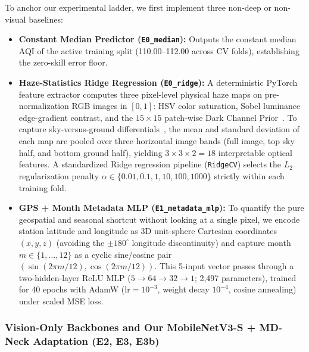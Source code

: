 \documentclass[conference]{IEEEtran}
\begin{document}
To anchor our experimental ladder, we first implement three non-deep or
non-visual baselines:
\begin{itemize}
  \item \textbf{Constant Median Predictor (\texttt{E0\_median}):} Outputs the
        constant median AQI of the active training split (110.00--112.00 across
        CV folds), establishing the zero-skill error floor.
  \item \textbf{Haze-Statistics Ridge Regression (\texttt{E0\_ridge}):} A
        deterministic PyTorch feature extractor computes three pixel-level
        physical haze maps on pre-normalization RGB images in $[0, 1]$: HSV
        color saturation, Sobel luminance edge-gradient contrast, and the
        $15 \times 15$ patch-wise Dark Channel
        Prior~\cite{marzaguiReviewImageQuality2024,
        wangPrototypeFeatureRepresentationGuided2026}. To capture
        sky-versus-ground differentials~\cite{chakrabortyCanImageTell2024,
        vahdatpourForecastingVisualizingAir2025}, the mean and standard
        deviation of each map are pooled over three horizontal image bands (full
        image, top sky half, and bottom ground half), yielding
        $3 \times 3 \times 2 = 18$ interpretable optical features. A
        standardized Ridge regression pipeline (\texttt{RidgeCV}) selects the
        $L_2$ regularization penalty
        $\alpha \in \{0.01, 0.1, 1, 10, 100, 1000\}$ strictly within each
        training fold.
  \item \textbf{GPS + Month Metadata MLP (\texttt{E1\_metadata\_mlp}):} To
        quantify the pure geospatial and seasonal shortcut without looking at a
        single pixel, we encode station latitude and longitude as 3D unit-sphere
        Cartesian coordinates $(x, y, z)$ (avoiding the $\pm 180^\circ$
        longitude discontinuity) and capture month $m \in \{1,\dots,12\}$ as a
        cyclic sine/cosine pair $(\sin(2\pi m/12), \cos(2\pi m/12))$. This
        5-input vector passes through a two-hidden-layer ReLU MLP
        ($5 \to 64 \to 32 \to 1$; 2,497 parameters), trained for 40 epochs with
        AdamW ($\text{lr} = 10^{-3}$, weight decay $10^{-4}$, cosine annealing)
        under scaled MSE loss.
\end{itemize}

\subsubsection{
  Vision-Only Backbones and Our MobileNetV3-S + MD-Neck Adaptation (E2, E3, E3b)
}
\end{document}
